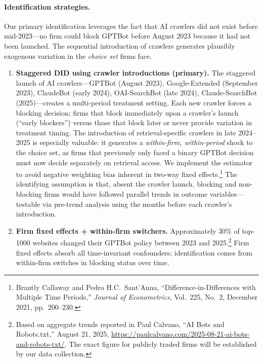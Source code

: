\documentclass[12pt,a4paper]{article}
\begin{document}
\paragraph{Identification strategies.}

Our primary identification leverages the fact that AI crawlers did not exist before mid-2023---no firm could block GPTBot before August 2023 because it had not been launched. The sequential introduction of crawlers generates plausibly exogenous variation in the \emph{choice set} firms face.

\begin{enumerate}
    \item \textbf{Staggered DID using crawler introductions (primary).} The staggered launch of AI crawlers---GPTBot (August 2023), Google-Extended (September 2023), ClaudeBot (early 2024), OAI-SearchBot (late 2024), Claude-SearchBot (2025)---creates a multi-period treatment setting. Each new crawler forces a blocking decision; firms that block immediately upon a crawler's launch (``early blockers'') versus those that block later or never provide variation in treatment timing. The introduction of retrieval-specific crawlers in late 2024--2025 is especially valuable: it generates a \emph{within-firm, within-period} shock to the choice set, as firms that previously only faced a binary GPTBot decision must now decide separately on retrieval access. We implement the \citet{CallawayS2021} estimator to avoid negative weighting bias inherent in two-way fixed effects.\footnote{Brantly Callaway and Pedro H.C.~Sant'Anna, ``Difference-in-Differences with Multiple Time Periods,'' \emph{Journal of Econometrics}, Vol.~225, No.~2, December 2021, pp.~200--230.} The identifying assumption is that, absent the crawler launch, blocking and non-blocking firms would have followed parallel trends in outcome variables---testable via pre-trend analysis using the months before each crawler's introduction.

    \item \textbf{Firm fixed effects + within-firm switchers.} Approximately 30\% of top-1000 websites changed their GPTBot policy between 2023 and 2025.\footnote{Based on aggregate trends reported in Paul Calvano, ``AI Bots and Robots.txt,'' August 21, 2025, \url{https://paulcalvano.com/2025-08-21-ai-bots-and-robots-txt/}. The exact figure for publicly traded firms will be established by our data collection.} Firm fixed effects absorb all time-invariant confounders; identification comes from within-firm switches in blocking status over time.


\end{enumerate}
\end{document}
